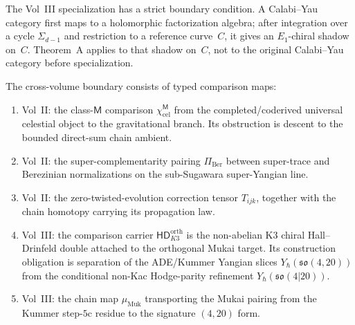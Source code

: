 The Vol~III specialization has a strict boundary condition. A
Calabi--Yau category first maps to a holomorphic factorization algebra;
after integration over a cycle $\Sigma_{d-1}$ and restriction to a
reference curve~$C$, it gives an $E_1$-chiral shadow on~$C$. Theorem~A
applies to that shadow on~$C$, not to the original Calabi--Yau category
before specialization.

The cross-volume boundary consists of typed comparison maps:
\begin{enumerate}[label=\textup{(\roman*)}]
\item Vol~II: the class-$\mathsf M$ comparison
 $\chi_{\mathrm{cel}}^{\mathsf M}$ from the completed/coderived
 universal celestial object to the gravitational branch. Its
 obstruction is descent to the bounded direct-sum chain ambient.
\item Vol~II: the super-complementarity pairing
 $\Pi_{\mathrm{Ber}}$ between super-trace and Berezinian
 normalizations on the sub-Sugawara super-Yangian line.
\item Vol~II: the zero-twisted-evolution correction tensor $T_{ijk}$,
 together with the chain homotopy carrying its propagation law.
\item Vol~III: the comparison carrier
 $\mathsf{HD}_{K3}^{\mathrm{orth}}$ is the non-abelian K3 chiral
 Hall--Drinfeld double attached to the orthogonal Mukai target. Its
 construction obligation is separation of the ADE/Kummer Yangian slices
 $Y_{\hbar}(\mathfrak{so}(4,20))$ from the conditional non-Kac
 Hodge-parity refinement $Y_{\hbar}(\mathfrak{so}(4|20))$.
\item Vol~III: the chain map $\mu_{\mathrm{Muk}}$ transporting the
 Mukai pairing from the Kummer step-$5$c residue to the signature
 $(4,20)$ form.
\end{enumerate}

\label{sec:concordance-non-principal-w}
\label{sec:concordance-e1-modular-theory}
\label{sec:concordance-structural-upgrades}
\label{sec:concordance-analytic-sewing}
\label{subsec:concordance-koszulness-meta-theorem}
\label{subsec:concordance-shadow-depth-classes}
\label{subsec:concordance-further-characterizations}
\label{subsec:concordance-bifunctor-obstruction}
\label{subsec:concordance-koszulness-xref}
\label{subsec:concordance-computational-diagnostics}
\label{subsec:coderived-ran}
\label{subsec:completion-kinematics-theory}
\label{subsec:analytic-completion-theory}
\label{sec:concordance-arithmetic-sewing}

